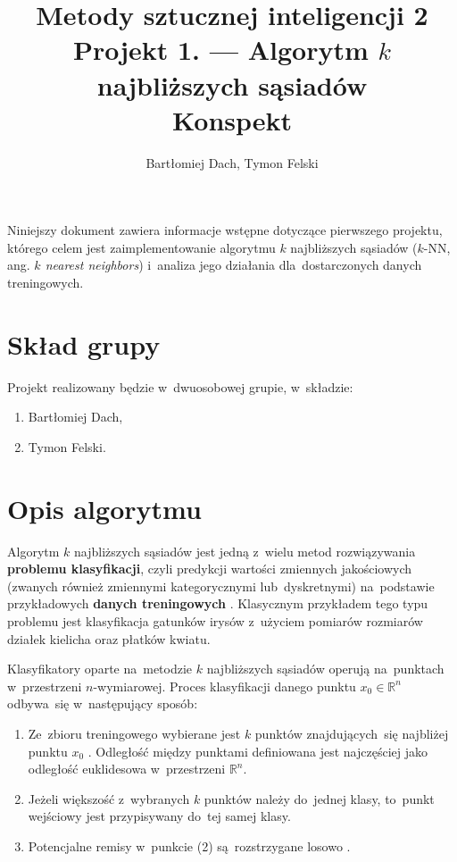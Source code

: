 \documentclass[11pt,a4paper]{article}
\begin{document}
\title{Metody sztucznej inteligencji 2 \\
\Large{
    Projekt 1. --- Algorytm $k$ najbliższych sąsiadów \\
    Konspekt
}}
\author{Bartłomiej Dach, Tymon Felski}
\maketitle

\noindent
Niniejszy dokument zawiera informacje wstępne dotyczące pierwszego projektu, którego celem jest zaimplementowanie algorytmu $k$ najbliższych sąsiadów ($k$-NN, ang. \emph{$k$ nearest neighbors}) i~analiza jego działania dla~dostarczonych danych treningowych.

\section{Skład grupy}

Projekt realizowany będzie w~dwuosobowej grupie, w~składzie:

\begin{enumerate}
    \item Bartłomiej Dach,
    \item Tymon Felski.
\end{enumerate}

\section{Opis algorytmu}

Algorytm $k$ najbliższych sąsiadów jest jedną z~wielu metod rozwiązywania \textbf{problemu klasyfikacji}, czyli predykcji wartości zmiennych jakościowych (zwanych również zmiennymi kategorycznymi lub~dyskretnymi) na~podstawie przykładowych \textbf{danych treningowych} \cite[s.~9--10]{hastie2009}.
Klasycznym przykładem tego typu problemu jest klasyfikacja gatunków irysów z~użyciem pomiarów rozmiarów działek kielicha oraz płatków kwiatu.

Klasyfikatory oparte na~metodzie $k$ najbliższych sąsiadów operują na~punktach w~przestrzeni $n$-wymiarowej.
Proces klasyfikacji danego punktu $x_0 \in \mathbb{R}^n$ odbywa~się w~następujący sposób:

\begin{enumerate}
    \item Ze~zbioru treningowego wybierane jest $k$ punktów znajdujących~się najbliżej punktu $x_0$ \cite[s.~261]{vapnik1998}.
    Odległość między punktami definiowana jest najczęściej jako odległość euklidesowa w~przestrzeni $\mathbb{R}^n$.
    \item Jeżeli większość z~wybranych $k$ punktów należy do~jednej klasy, to~punkt wejściowy jest przypisywany do~tej samej klasy.
    \item Potencjalne remisy w~punkcie (2) są~rozstrzygane losowo \cite[s.~463--464]{hastie2009}.
\end{enumerate}
\end{document}
